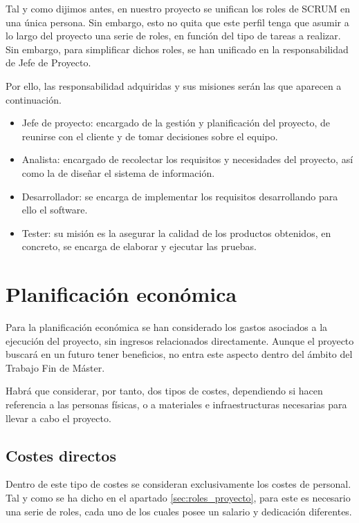 Tal y como dijimos antes, en nuestro proyecto se unifican los roles de SCRUM en una única persona. Sin embargo, esto no quita que este perfil tenga que asumir a lo largo del proyecto una serie de roles, en función del tipo de tareas a realizar. Sin embargo, para simplificar dichos roles, se han unificado en la responsabilidad de Jefe de Proyecto.

Por ello, las responsabilidad adquiridas y sus misiones serán las que aparecen a continuación.

\begin{itemize}
    \item Jefe de proyecto: encargado de la gestión y planificación del proyecto, de reunirse con el cliente y de tomar decisiones sobre el equipo.
    \item Analista: encargado de recolectar los requisitos y necesidades del proyecto, así como la de diseñar el sistema de información.
    \item Desarrollador: se encarga de implementar los requisitos desarrollando para ello el software.
    \item Tester: su misión es la asegurar la calidad de los productos obtenidos, en concreto, se encarga de elaborar y ejecutar las pruebas.
\end{itemize}

\section{Planificación económica}\label{sec:planificacion_economica}

Para la planificación económica se han considerado los gastos asociados a la ejecución del proyecto, sin ingresos relacionados directamente. Aunque el proyecto buscará en un futuro tener beneficios, no entra este aspecto dentro del ámbito del Trabajo Fin de Máster.

Habrá que considerar, por tanto, dos tipos de costes, dependiendo si hacen referencia a las personas físicas, o a materiales e infraestructuras necesarias para llevar a cabo el proyecto.

\subsection{Costes directos}
Dentro de este tipo de costes se consideran exclusivamente los costes de personal. Tal y como se ha dicho en el apartado \ref{sec:roles_proyecto}, para este es necesario una serie de roles, cada uno de los cuales posee un salario y dedicación diferentes.

